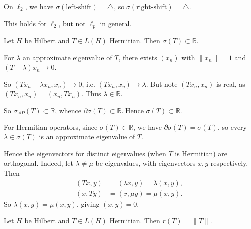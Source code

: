 \documentclass[12pt]{article}
\begin{document}
\begin{exbox}
	On $\ell_2$, we have $\sigma(\text{left-shift}) = \triangle$, so $\sigma(\text{right-shift}) = \triangle$.

	This holds for $\ell_2$, but not $\ell_p$ in general.
\end{exbox}


\begin{theorem}
	Let $H$ be Hilbert and $T \in L(H)$ Hermitian. Then $\sigma(T) \subset \mathbb{R}$.
\end{theorem}

\begin{proofbox}
	For $\lambda$ an approximate eigenvalue of $T$, there exists $(x_n)$ with $\|x_n\| = 1$ and $(T - \lambda)x_n \to 0$.

	So $(Tx_n - \lambda x_n, x_n) \to 0$, i.e.  $(Tx_n, x_n) \to \lambda$. But note $(Tx_n, x_n)$ is real, as $(Tx_n, x_n) = (x_n, Tx_n)$. Thus $\lambda \in \mathbb{R}$.

	So $\sigma_{AP}(T) \subset \mathbb{R}$, whence $\partial \sigma(T) \subset \mathbb{R}$. Hence $\sigma(T) \subset \mathbb{R}$.
\end{proofbox}

For Hermitian operators, since $\sigma(T) \subset \mathbb{R}$, we have $\partial \sigma(T) = \sigma(T)$, so every $\lambda \in \sigma(T)$ is an approximate eigenvalue of $T$.

\begin{remark}
	Hence the eigenvectors for distinct eigenvalues (when $T$ is Hermitian) are orthogonal. Indeed, let $\lambda \neq \mu$ be eigenvalues, with eigenvectors $x, y$ respectively. Then
	\begin{align*}
		(Tx, y) &= (\lambda x, y) = \lambda(x, y), \\
		(x, Ty) &= (x, \mu y) = \mu(x, y).
	\end{align*}
	So $\lambda(x, y) = \mu(x, y)$, giving $(x, y) = 0$.
\end{remark}

\begin{theorem}
	Let $H$ be Hilbert and $T \in L(H)$ Hermitian. Then $r(T) = \|T\|$.
\end{theorem}
\end{document}
